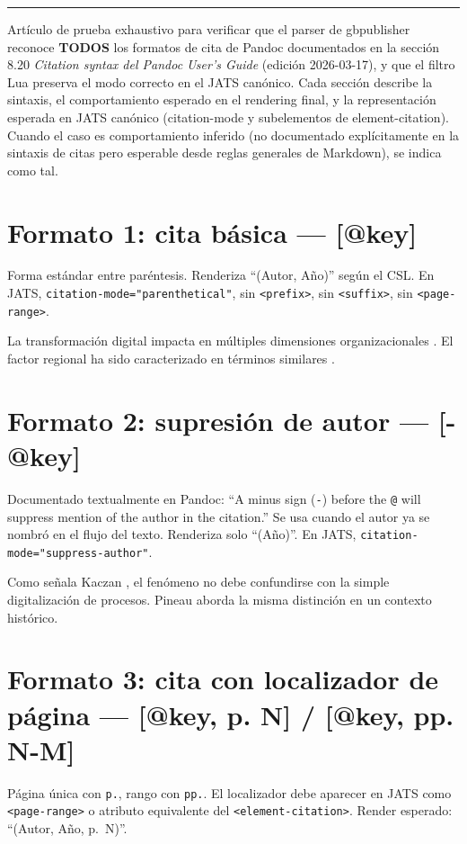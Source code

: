 \bigskip
\noindent\rule{\linewidth}{0.4pt}
\bigskip

Artículo de prueba exhaustivo para verificar que el parser de gbpublisher reconoce \textbf{TODOS} los formatos de cita de Pandoc documentados en la sección 8.20 \textit{Citation syntax del Pandoc User’s Guide} (edición 2026-03-17), y que el filtro Lua preserva el modo correcto en el JATS canónico. Cada sección describe la sintaxis, el comportamiento esperado en el rendering final, y la representación esperada en JATS canónico (citation-mode y subelementos de element-citation). Cuando el caso es comportamiento inferido (no documentado explícitamente en la sintaxis de citas pero esperable desde reglas generales de Markdown), se indica como tal.


\section{Formato 1: cita básica — [@key]}
Forma estándar entre paréntesis. Renderiza “(Autor, Año)” según el CSL. En JATS, \texttt{citation-mode="parenthetical"}, sin \texttt{<prefix>}, sin \texttt{<suffix>}, sin \texttt{<page-range>}.

La transformación digital impacta en múltiples dimensiones organizacionales \autocite{2961-KACZAN2016}. El factor regional ha sido caracterizado en términos similares \autocite{3036-ORBUCH2020}.


\section{Formato 2: supresión de autor — [-@key]}
Documentado textualmente en Pandoc: “A minus sign (\texttt{-}) before the \texttt{@} will suppress mention of the author in the citation.” Se usa cuando el autor ya se nombró en el flujo del texto. Renderiza solo “(Año)”. En JATS, \texttt{citation-mode="suppress-author"}.

Como señala Kaczan \autocite*{2961-KACZAN2016}, el fenómeno no debe confundirse con la simple digitalización de procesos. Pineau \autocite*{3041-PINEAU1999} aborda la misma distinción en un contexto histórico.


\section{Formato 3: cita con localizador de página — [@key, p. N] / [@key, pp. N-M]}
Página única con \texttt{p.}, rango con \texttt{pp.}. El localizador debe aparecer en JATS como \texttt{<page-range>} o atributo equivalente del \texttt{<element-citation>}. Render esperado: “(Autor, Año, p. N)”.

